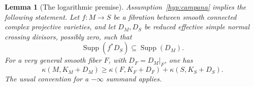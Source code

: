 \documentclass[11pt,letterpaper]{article}
\DeclareMathOperator{\Supp}{Supp}
\newtheorem{lemma}[theorem]{Lemma}
\theoremstyle{definition}
\theoremstyle{remark}
\begin{document}
\begin{lemma}[The logarithmic premise]\label{red:log-iitaka}
Assumption~\ref{hyp:campana} implies the following statement. Let
\(f:M\to S\) be a fibration between smooth connected complex projective
varieties, and let \(D_M,D_S\) be reduced effective simple normal crossing
divisors, possibly zero, such that
\begin{equation}\label{red:boundary-compatibility}
 \Supp(f^*D_S)\subseteq\Supp(D_M).
\end{equation}
For a very general smooth fiber \(F\), with \(D_F=D_M|_F\), one has
\begin{equation}\label{red:log-iitaka-inequality}
 \kappa(M,K_M+D_M)
 \geq \kappa(F,K_F+D_F)+\kappa(S,K_S+D_S).
\end{equation}
The usual convention for a \(-\infty\) summand applies.
\end{lemma}
\end{document}
